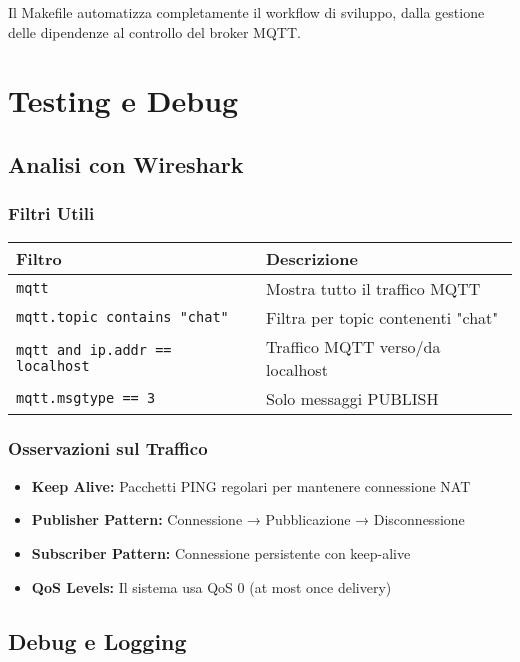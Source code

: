 \documentclass[12pt,a4paper]{article}
\begin{document}
Il Makefile automatizza completamente il workflow di sviluppo, dalla gestione delle dipendenze al controllo del broker MQTT.

\section{Testing e Debug}

\subsection{Analisi con Wireshark}

\subsubsection{Filtri Utili}

\begin{longtable}{|p{6cm}|p{8cm}|}
\hline
\textbf{Filtro} & \textbf{Descrizione} \\
\hline
\texttt{mqtt} & Mostra tutto il traffico MQTT \\
\hline
\texttt{mqtt.topic contains "chat"} & Filtra per topic contenenti "chat" \\
\hline
\texttt{mqtt and ip.addr == localhost} & Traffico MQTT verso/da localhost \\
\hline
\texttt{mqtt.msgtype == 3} & Solo messaggi PUBLISH \\
\hline
\end{longtable}

\subsubsection{Osservazioni sul Traffico}
\begin{itemize}
    \item \textbf{Keep Alive:} Pacchetti PING regolari per mantenere connessione NAT
    \item \textbf{Publisher Pattern:} Connessione → Pubblicazione → Disconnessione
    \item \textbf{Subscriber Pattern:} Connessione persistente con keep-alive
    \item \textbf{QoS Levels:} Il sistema usa QoS 0 (at most once delivery)
\end{itemize}

\subsection{Debug e Logging}
\end{document}
